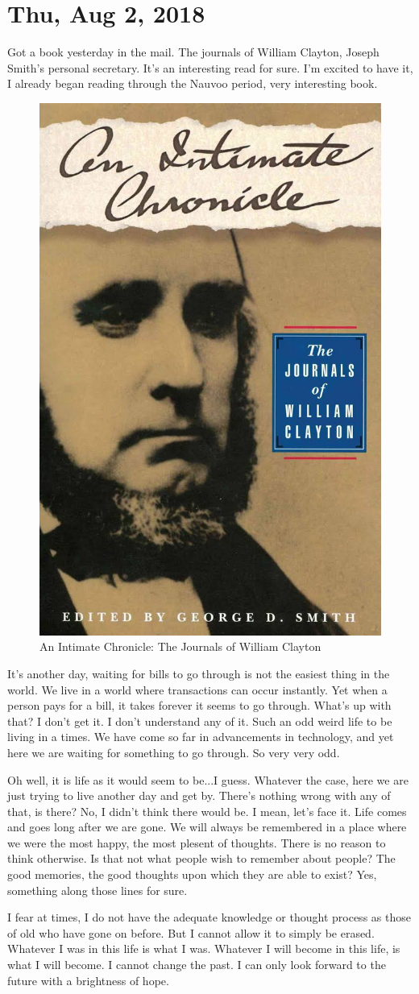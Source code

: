 \section{Thu, Aug 2, 2018}

Got a book yesterday in the mail. The journals of William Clayton, Joseph Smith's
personal secretary. It's an interesting read for sure. I'm excited to have it, I
already began reading through the Nauvoo period, very interesting book.

\begin{figure}[h!]
  \centering
  \includegraphics[width=0.5\linewidth]{2018/images/clayton.jpg}
  \caption{An Intimate Chronicle: The Journals of William Clayton}
  \label{fig:clayton}
\end{figure}

It's another day, waiting for bills to go through is not the easiest thing in the
world. We live in a world where transactions can occur instantly. Yet when a person
pays for a bill, it takes forever it seems to go through. What's up with that? I
don't get it. I don't understand any of it. Such an odd weird life to be living in a
times. We have come so far in advancements in technology, and yet here we are waiting
for something to go through. So very very odd.

Oh well, it is life as it would seem to be...I guess. Whatever the case, here we are
just trying to live another day and get by. There's nothing wrong with any of that,
is there? No, I didn't think there would be. I mean, let's face it. Life comes and
goes long after we are gone. We will always be remembered in a place where we were
the most happy, the most plesent of thoughts. There is no reason to think otherwise.
Is that not what people wish to remember about people? The good memories, the good
thoughts upon which they are able to exist? Yes, something along those lines for
sure.

I fear at times, I do not have the adequate knowledge or thought process as those of
old who have gone on before. But I cannot allow it to simply be erased. Whatever I
was in this life is what I was. Whatever I will become in this life, is what I will
become. I cannot change the past. I can only look forward to the future with a
brightness of hope.
